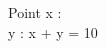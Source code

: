 \documentclass[a4paper,10pt,fleqn]{article}
\begin{document}
\begin{schema}{Point}
x : \nat \\
y : \nat
\where
x + y = 10
\end{schema}
\end{document}
